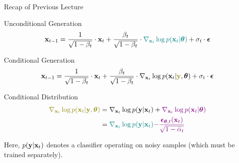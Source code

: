 \documentclass{beamer}
\begin{document}
\begin{frame}{Recap of Previous Lecture}
	\begin{block}{Unconditional Generation}
		\vspace{-0.3cm}
		\[
			\mathbf{x}_{t - 1} = \frac{1}{\sqrt{1 - \beta_t}} \cdot \mathbf{x}_t + \frac{\beta_t}{\sqrt{1 - \beta_t}} \cdot {\color{teal} \nabla_{\mathbf{x}_t} \log p(\mathbf{x}_t | \boldsymbol{\theta})} +  \sigma_t \cdot \boldsymbol{\epsilon}
		\]
		\vspace{-0.5cm}
	\end{block}
	\begin{block}{Conditional Generation}
		\vspace{-0.5cm}
		\[
			\bx_{t - 1} =  \frac{1}{\sqrt{1 - \beta_t}}\cdot \bx_t +  \frac{\beta_t}{\sqrt{1 - \beta_t}}  \cdot  \nabla_{\bx_t} \log p(\bx_t | {\color{olive}\by}, \btheta) +  \sigma_t \cdot \bepsilon
		\]
		\vspace{-0.5cm}
	\end{block}
	\begin{block}{Conditional Distribution}
		\vspace{-0.5cm}
		\begin{align*}
			{\color{olive}\nabla_{\bx_t} \log p(\bx_t | \by, \btheta)} &= \nabla_{\bx_t} \log p(\by | \bx_t) + {\color{violet}\nabla_{\bx_t} \log p(\bx_t | \btheta)}\\
			&= {\color{teal}\nabla_{\bx_t} \log p(\by | \bx_t)} {\color{violet}- \frac{\bepsilon_{\btheta, t}(\bx_t)}{\sqrt{1 - \bar{\alpha}_t}}}
		\end{align*}
		\vspace{-0.5cm}
	\end{block}
	Here, $p(\mathbf{y} | \mathbf{x}_t)$ denotes a classifier operating on noisy samples (which must be trained separately).
\end{frame}
\end{document}
